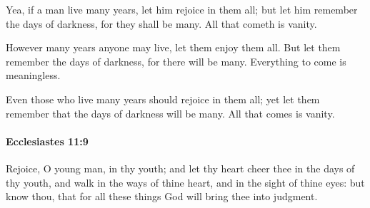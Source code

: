 			\begin{versebox}
					\item[BHS] 
					\item[LXX] 
					\item[ASV] Yea, if a man live many years, let him rejoice in them all; but let him remember the days of darkness, for they shall be many. All that cometh is vanity.
					\item[NIV] However many years anyone may live, let them enjoy them all. But let them remember the days of darkness, for there will be many. Everything to come is meaningless.
					\item[NRSV] Even those who live many years should rejoice in them all; yet let them remember that the days of darkness will be many. All that comes is vanity.
			\end{versebox}

		\paragraph{Ecclesiastes 11:9} %
			\label{ECCLESIASTES-11-9}

			Rejoice, O young man, in thy youth; and let thy heart cheer thee in the days of thy youth, and walk in the ways of thine heart, and in the sight of thine eyes: but know thou, that for all these things God will bring thee into judgment.

